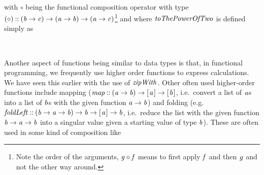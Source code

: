 \documentclass[paper=A4,twoside=true,openright,parskip=full,chapterprefix=true,headings=normal,bibliography=totoc,listof=totoc,titlepage=on,captions=tableabove,draft=false,british]{scrreprt}%
\begin{document}
\begin{hscode}\SaveRestoreHook
{}%
%
\>[B]{}\mathbin{::}\to {}\<[E]%
\\
\>[B]{}\mathrel{=}\mathbin{\circ}\<[E]%
\ColumnHook
\end{hscode}\resethooks
\vspace{-2\baselineskip}

with \ensuremath{\mathbin{\circ}} being the functional composition operator with type
\ensuremath{(\mathbin{\circ})\mathbin{::}(\Varid{b}\to \Varid{c})\to (\Varid{a}\to \Varid{b})\to (\Varid{a}\to \Varid{c})}\footnote{Note the order of the
  arguments, \ensuremath{\Varid{g}\mathbin{\circ}\Varid{f}} means to first apply \ensuremath{\Varid{f}} and then \ensuremath{\Varid{g}} and not the
  other way around.} and where \ensuremath{\Varid{toThePowerOfTwo}} is defined simply as


\begin{hscode}\SaveRestoreHook
{}%
%
\>[B]{}\mathbin{::}\to {}\<[E]%
\\
\>[B]{}\;\mathrel{=}\;\;\<[E]%
\ColumnHook
\end{hscode}\resethooks
\vspace{-2\baselineskip}

Another aspect of functions being similar to data types is that, in
functional programming, we frequently use higher order functions to
express calculations. We have seen this earlier with the use of
\ensuremath{\Varid{zipWith}}. Other often used higher-order functions include mapping
(\ensuremath{\Varid{map}\mathbin{::}(\Varid{a}\to \Varid{b})\to [\mskip1.5mu \Varid{a}\mskip1.5mu]\to [\mskip1.5mu \Varid{b}\mskip1.5mu]}, i.e.~convert a list of \ensuremath{\Varid{a}}s into a
list of \ensuremath{\Varid{b}}s with the given function \ensuremath{\Varid{a}\to \Varid{b}}) and folding (e.g.
\ensuremath{\Varid{foldLeft}\mathbin{::}(\Varid{b}\to \Varid{a}\to \Varid{b})\to \Varid{b}\to [\mskip1.5mu \Varid{a}\mskip1.5mu]\to \Varid{b}}, i.e.~reduce the list with
the given function \ensuremath{\Varid{b}\to \Varid{a}\to \Varid{b}} into a singular value given a starting
value of type \ensuremath{\Varid{b}}). These are often used in some kind of composition
like
\end{document}

